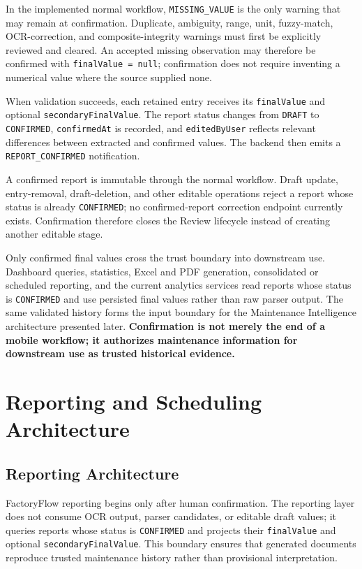 In the implemented normal workflow, \texttt{MISSING\_VALUE} is the only warning that may remain at confirmation. Duplicate, ambiguity, range, unit, fuzzy-match, OCR-correction, and composite-integrity warnings must first be explicitly reviewed and cleared. An accepted missing observation may therefore be confirmed with \texttt{finalValue = null}; confirmation does not require inventing a numerical value where the source supplied none.

When validation succeeds, each retained entry receives its \texttt{finalValue} and optional \texttt{secondaryFinalValue}. The report status changes from \texttt{DRAFT} to \texttt{CONFIRMED}, \texttt{confirmedAt} is recorded, and \texttt{editedByUser} reflects relevant differences between extracted and confirmed values. The backend then emits a \texttt{REPORT\_CONFIRMED} notification.

A confirmed report is immutable through the normal workflow. Draft update, entry-removal, draft-deletion, and other editable operations reject a report whose status is already \texttt{CONFIRMED}; no confirmed-report correction endpoint currently exists. Confirmation therefore closes the Review lifecycle instead of creating another editable stage.

Only confirmed final values cross the trust boundary into downstream use. Dashboard queries, statistics, Excel and PDF generation, consolidated or scheduled reporting, and the current analytics services read reports whose status is \texttt{CONFIRMED} and use persisted final values rather than raw parser output. The same validated history forms the input boundary for the Maintenance Intelligence architecture presented later. \textbf{Confirmation is not merely the end of a mobile workflow; it authorizes maintenance information for downstream use as trusted historical evidence.}

\section{Reporting and Scheduling Architecture}

\subsection{Reporting Architecture}
\label{subsec:reporting-architecture}

FactoryFlow reporting begins only after human confirmation. The reporting layer does not consume OCR output, parser candidates, or editable draft values; it queries reports whose status is \texttt{CONFIRMED} and projects their \texttt{finalValue} and optional \texttt{secondaryFinalValue}. This boundary ensures that generated documents reproduce trusted maintenance history rather than provisional interpretation.

